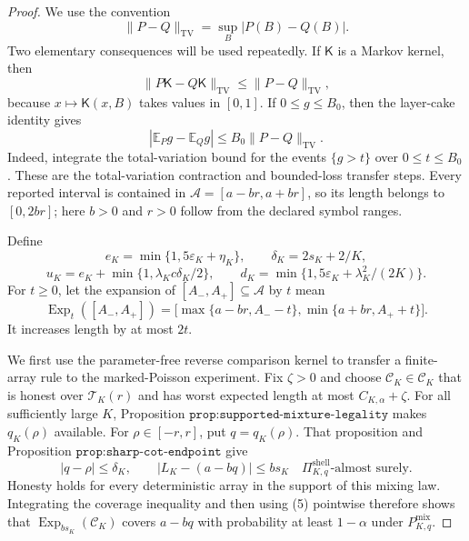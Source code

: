 \documentclass{article}
\begin{document}
\begin{proof}
We use the convention
\[
 \lVert P-Q\rVert_{\mathrm{TV}}=\sup_B|P(B)-Q(B)|.
\]
Two elementary consequences will be used repeatedly.  If \(\mathsf K\) is a
Markov kernel, then
\[
 \lVert P\mathsf K-Q\mathsf K\rVert_{\mathrm{TV}}
 \leq \lVert P-Q\rVert_{\mathrm{TV}},
 \tag{1}
\]
because \(x\mapsto\mathsf K(x,B)\) takes values in \([0,1]\).  If
\(0\leq g\leq B_0\), then the layer-cake identity gives
\[
 |\mathbb E_Pg-\mathbb E_Qg|
 \leq B_0\lVert P-Q\rVert_{\mathrm{TV}}.
 \tag{2}
\]
Indeed, integrate the total-variation bound for the events \(\{g>t\}\)
over \(0\leq t\leq B_0\).  These are the total-variation contraction and
bounded-loss transfer steps.  Every reported interval is contained in
\(\mathcal A=[a-br,a+br]\), so its length belongs to \([0,2br]\); here
\(b>0\) and \(r>0\) follow from the declared symbol ranges.

Define
\[
 e_K=\min\{1,5\varepsilon_K+\eta_K\},\qquad
 \delta_K=2s_K+2/K,
\]
\[
 u_K=e_K+\min\{1,\lambda_Kc\delta_K/2\},
 \qquad
 d_K=\min\{1,5\varepsilon_K+\lambda_K^2/(2K)\}.
 \tag{3}
\]
For \(t\geq0\), let the expansion of \([A_-,A_+]\subseteq\mathcal A\)
by \(t\) mean
\[
 \operatorname{Exp}_t([A_-,A_+])
 =\bigl[\max\{a-br,A_--t\},\min\{a+br,A_++t\}\bigr].
 \tag{4}
\]
It increases length by at most \(2t\).

We first use the parameter-free reverse comparison kernel to transfer a
finite-array rule to the marked-Poisson experiment.  Fix \(\zeta>0\) and
choose \(\mathcal C_K\in\mathscr C_K\) that is honest over
\(\mathcal T_K(r)\) and has worst expected length at most
\(C_{K,\alpha}+\zeta\).  For all sufficiently large \(K\), Proposition
\(\texttt{prop:supported-mixture-legality}\) makes \(q_K(\rho)\) available.
For \(\rho\in[-r,r]\), put \(q=q_K(\rho)\).  That proposition and
Proposition \(\texttt{prop:sharp-cot-endpoint}\) give
\[
 |q-\rho|\leq\delta_K,
 \qquad
 |L_K-(a-bq)|\leq bs_K
 \quad\Pi_{K,q}^{\mathrm{shell}}\text{-almost surely}.
 \tag{5}
\]
Honesty holds for every deterministic array in the support of this mixing
law.  Integrating the coverage inequality and then using (5) pointwise
therefore shows that
\(\operatorname{Exp}_{bs_K}(\mathcal C_K)\) covers \(a-bq\) with
probability at least \(1-\alpha\) under \(P^{\mathrm{mix}}_{K,q}\).


\end{proof}
\end{document}
